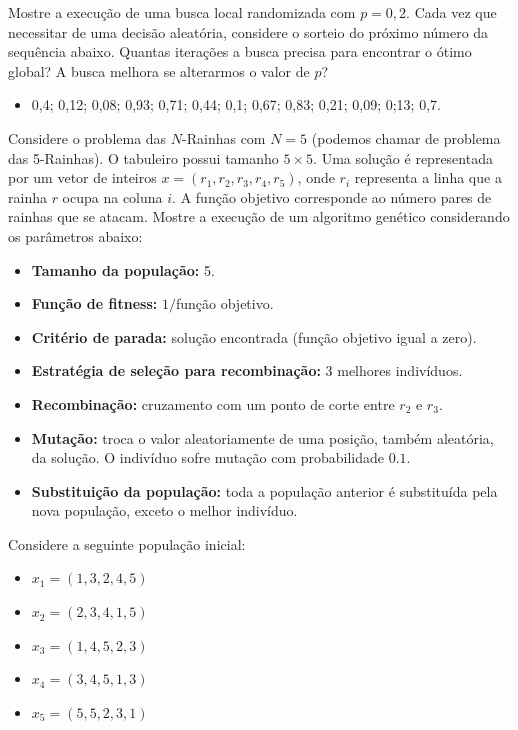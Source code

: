 Mostre a execução de uma busca local randomizada com $p = 0,2$. Cada vez que necessitar de uma decisão aleatória, considere o sorteio do próximo número da sequência abaixo. Quantas iterações a busca precisa para encontrar o ótimo global? A busca melhora se alterarmos o valor de $p$?

\begin{itemize}
	\item 0,4; 0,12; 0,08; 0,93; 0,71; 0,44; 0,1; 0,67; 0,83; 0,21; 0,09; 0;13; 0,7.
\end{itemize}

\insertspace

\begin{exercise}
Considere o problema das $N$-Rainhas com $N = 5$ (podemos chamar de problema das 5-Rainhas). O tabuleiro possui tamanho $5 \times 5$. Uma solução é representada por um vetor de inteiros $x = (r_1, r_2, r_3, r_4, r_5)$, onde $r_i$ representa a linha que a rainha $r$ ocupa na coluna $i$. A função objetivo corresponde ao número pares de rainhas que se atacam. Mostre a execução de um algoritmo genético considerando os parâmetros abaixo:
\begin{itemize}
	\item \textbf{Tamanho da população:} 5.
	\item \textbf{Função de fitness:} $1/$função objetivo.
	\item \textbf{Critério de parada:} solução encontrada (função objetivo igual a zero).
	\item \textbf{Estratégia de seleção para recombinação:} 3 melhores indivíduos.
	\item \textbf{Recombinação:} cruzamento com um ponto de corte entre $r_2$ e $r_3$.
	\item \textbf{Mutação:} troca o valor aleatoriamente de uma posição, também aleatória, da solução. O indivíduo sofre mutação com probabilidade $0.1$.
	\item \textbf{Substituição da população:} toda a população anterior é substituída pela nova população, exceto o melhor indivíduo.
\end{itemize}

\insertspace

Considere a seguinte população inicial:
\begin{itemize}
	\item $x_1 = (1, 3, 2, 4, 5)$
	\item $x_2 = (2, 3, 4, 1, 5)$
	\item $x_3 = (1, 4, 5, 2, 3)$
	\item $x_4 = (3, 4, 5, 1, 3)$
	\item $x_5 = (5, 5, 2, 3, 1)$
\end{itemize}


\end{exercise}
